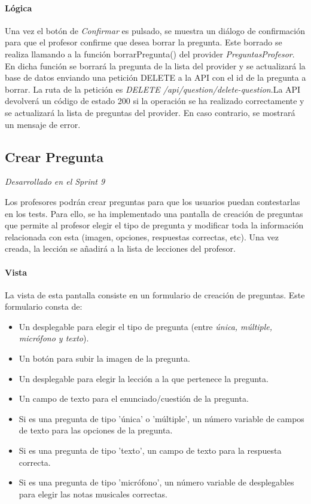 \paragraph*{Lógica}
Una vez el botón de \textit{Confirmar} es pulsado, se muestra un diálogo de confirmación para que el profesor confirme que desea borrar la pregunta.
Este borrado se realiza llamando a la función borrarPregunta() del provider \textit{PreguntasProfesor}. En dicha función se borrará la pregunta 
de la lista del provider y se actualizará la base de datos enviando una petición DELETE a la API con el id de la pregunta a borrar. 
La ruta de la petición es \textit{DELETE /api/question/delete-question}.La API devolverá un código de estado 200 si 
la operación se ha realizado correctamente y se actualizará la lista de preguntas del provider. En caso contrario, se mostrará un mensaje de error.


\subsection{Crear Pregunta} 

\textit{Desarrollado en el Sprint 9}

Los profesores podrán crear preguntas para que los usuarios puedan contestarlas en los tests. 
Para ello, se ha implementado una pantalla de creación de preguntas que permite al profesor elegir el tipo de pregunta y modificar 
toda la información relacionada con esta (imagen, opciones, respuestas correctas, etc). Una vez creada, la lección se añadirá a la lista de lecciones del profesor.



\paragraph*{Vista}
La vista de esta pantalla consiste en un formulario de creación de preguntas. Este formulario consta de:
\begin{itemize}
  \item Un desplegable para elegir el tipo de pregunta (entre \textit{única, múltiple, micrófono y texto}).
  \item Un botón para subir la imagen de la pregunta.
  \item Un desplegable para elegir la lección a la que pertenece la pregunta.
  \item Un campo de texto para el enunciado/cuestión de la pregunta.
  \item Si es una pregunta de tipo 'única' o 'múltiple', un número variable de campos de texto para las opciones de la pregunta.
  \item Si es una pregunta de tipo 'texto', un campo de texto para la respuesta correcta.
  \item Si es una pregunta de tipo 'micrófono', un número variable de desplegables para elegir las notas musicales correctas.
\end{itemize}


